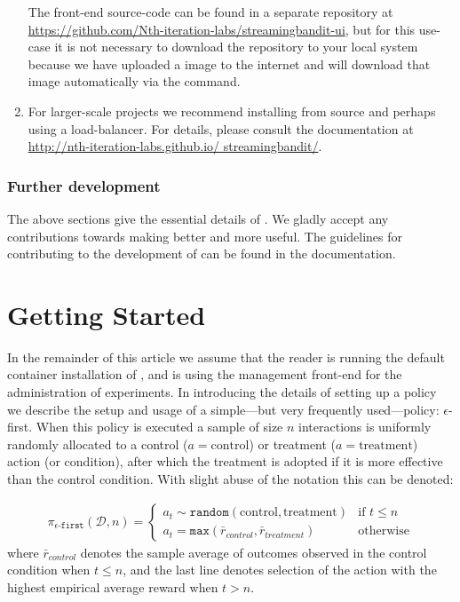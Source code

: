 \documentclass[nojss]{jss}
\begin{document}
\begin{enumerate}
The front-end source-code can be found in a separate repository at \url{https://github.com/Nth-iteration-labs/streamingbandit-ui}, but for this use-case it is not necessary to download the repository to your local system because we have uploaded a  image to the internet and  will download that image automatically via the  command.
\item For larger-scale projects we recommend installing from source and perhaps using a load-balancer. For details, please consult the documentation at \url{http://nth-iteration-labs.github.io/ streamingbandit/}.
\end{enumerate}

\subsubsection{Further development}
\label{subsec:dev}

The above sections give the essential details of . We gladly accept any contributions towards making  better and more useful. The guidelines for contributing to the development of  can be found in the documentation. 






\section{Getting Started}
\label{sec:usage}

In the remainder of this article we assume that the reader is running the default  container installation of , and is using the management front-end for the administration of experiments. In introducing the details of setting up a policy we describe the setup and usage of a simple---but very frequently used---policy: $\epsilon$-first. When this policy is executed a sample of size $n$ interactions is uniformly randomly allocated to a control ($a = \text{control}$) or treatment ($a = \text{treatment}$) action (or condition), after which the treatment is adopted if it is more effective than the control condition. With slight abuse of the notation this can be denoted:

\begin{eqnarray}
\label{eq:pol}
\pi_{\epsilon\texttt{-first}}(\mathcal{D}, n) = 
\begin{cases}
a_t \sim \texttt{random}(\text{control}, \text{treatment}) & \text{if } t \leq n \\
a_t = \texttt{max}( \bar{r}_{control}, \bar{r}_{treatment} ) &\text{otherwise}
\end{cases}
\end{eqnarray}
where $\bar{r}_{control}$ denotes the sample average of outcomes observed in the control condition when $t \leq n$, and the last line denotes selection of the action with the highest empirical average reward when $t>n$. 
\end{document}

